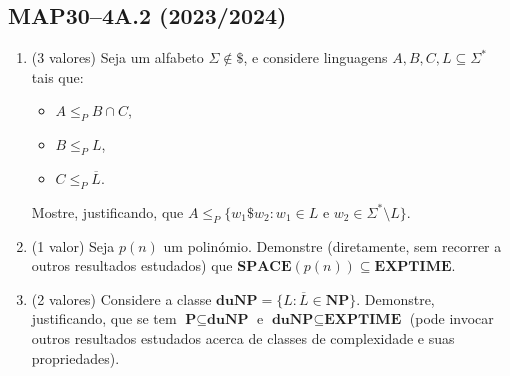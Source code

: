 \documentclass[a4paper,12pt]{article}
\begin{document}
\subsection*{MAP30–4A.2 (2023/2024)}
\begin{enumerate}[label=\alph*)]

  \item (3 valores) Seja um alfabeto $ \Sigma \notin \$ $, e considere linguagens $ A, B, C, L \subseteq \Sigma^* $ tais que:
  \begin{itemize}
      \item $ A \leq_P B \cap C $,
      \item $ B \leq_P L $,
      \item $ C \leq_P \overline{L} $.
  \end{itemize}
  Mostre, justificando, que $ A \leq_P \{ w_1\$ w_2 : w_1 \in L \text{ e } w_2 \in \Sigma^* \setminus L \} $.
  
  \item (1 valor) Seja $ p(n) $ um polinómio. Demonstre (diretamente, sem recorrer a outros resultados estudados) que $ \textbf{SPACE}(p(n)) \subseteq \textbf{EXPTIME} $.
  
  \item (2 valores) Considere a classe $ \textbf{duNP} = \{ L : \overline{L} \in \textbf{NP} \} $. Demonstre, justificando, que se tem $ \textbf{P} \subseteq \textbf{duNP} $ e $ \textbf{duNP} \subseteq \textbf{EXPTIME} $ (pode invocar outros resultados estudados acerca de classes de complexidade e suas propriedades).
  
\end{enumerate}
\end{document}
